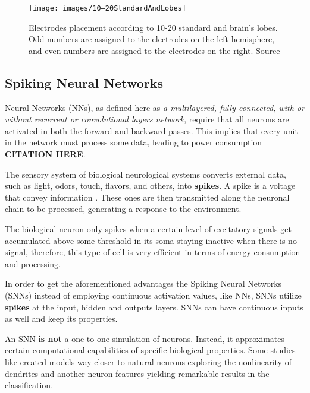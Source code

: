 		\begin{figure}[h]
			\centering
			\texttt{[image: images/10–20StandardAndLobes]}
			\caption[10-20 standard and brain lobes]{Electrodes placement according to 10-20 standard \cite{sistema10-20} and brain's lobes. Odd numbers are assigned to the electrodes on the left hemisphere, and even numbers are assigned to the electrodes on the right. Source \cite{JALALYBIDGOLY2020101788}}
			\label{fig:1020standardandlobes}
		\end{figure}
	
	\subsection{Spiking Neural Networks}
	
		\par Neural Networks (NNs), as defined here as \textit{a multilayered, fully connected, with or without recurrent or convolutional layers network}, require that all neurons are activated in both the forward and backward passes. This implies that every unit in the network must process some data, leading to power consumption \textbf{CITATION HERE}. 

		\par The sensory system of biological neurological systems converts external data, such as light, odors, touch, flavors, and others, into \textbf{spikes}. A spike is a voltage that convey information \cite{kasabov2019time}. These ones are then transmitted along the neuronal chain to be processed, generating a response to the environment.
		
		\par The biological neuron only spikes when a certain level of excitatory signals get accumulated above some threshold in its soma staying inactive when there is no signal, therefore, this type of cell is very efficient in terms of energy consumption and processing.
		
		\par In order to get the aforementioned advantages the Spiking Neural Networks (SNNs) instead of employing continuous activation values, like NNs, SNNs utilize \textbf{spikes} at the input, hidden and outputs layers. SNNs can have continuous inputs as well and keep its properties.
		
		
		\par An SNN \textbf{is not} a one-to-one simulation of neurons. Instead, it approximates certain computational capabilities of specific biological properties. Some studies like \cite{jones2020single} created models way closer to natural neurons exploring the nonlinearity of dendrites and another neuron features yielding remarkable results in the classification.
		
